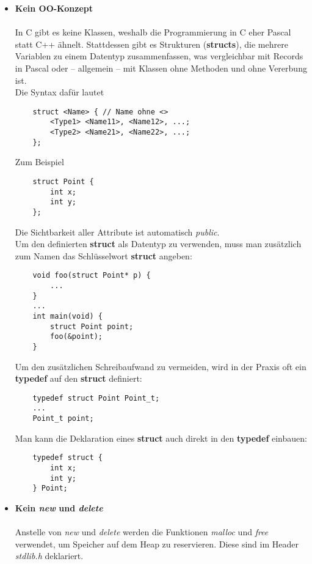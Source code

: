 \documentclass[
  accentcolor=tud1c,	%
  colorbacktitle,		%
  inverttitle,			%
  german,				%
  twoside
]{tudexercise}
\begin{document}
\begin{itemize}
\item[] \textbf{Kein OO-Konzept}\\\\
In C gibt es keine Klassen, weshalb die Programmierung in C eher Pascal statt C++ ähnelt.
Stattdessen gibt es Strukturen (\textbf{structs}), die mehrere Variablen zu einem Datentyp zusammenfassen, was vergleichbar mit Records in Pascal oder -- allgemein -- mit Klassen ohne Methoden und ohne Vererbung ist.\\

Die Syntax dafür lautet
\begin{lstlisting}
	struct <Name> { // Name ohne <>
		<Type1> <Name11>, <Name12>, ...;
		<Type2> <Name21>, <Name22>, ...;
	};
\end{lstlisting} 

Zum Beispiel
\begin{lstlisting}
	struct Point {
		int x;
		int y;
	};
\end{lstlisting}

Die Sichtbarkeit aller Attribute ist automatisch \emph{public}. \\

Um den definierten \textbf{struct} als Datentyp zu verwenden, muss man zusätzlich zum Namen das Schlüsselwort \textbf{struct} angeben:

\begin{lstlisting}
	void foo(struct Point* p) {
		...
	}
	...
	int main(void) {
		struct Point point;
		foo(&point);
	}
\end{lstlisting}

Um den zusätzlichen Schreibaufwand zu vermeiden, wird in der Praxis oft ein \textbf{typedef} auf den \textbf{struct} definiert:

\begin{lstlisting}
	typedef struct Point Point_t;
	...
	Point_t point;
\end{lstlisting}

Man kann die Deklaration eines \textbf{struct} auch direkt in den \textbf{typedef} einbauen:
\begin{lstlisting}
	typedef struct {
		int x;
		int y;	
	} Point;
\end{lstlisting}

\item[] \textbf{Kein \emph{new} und \emph{delete}}\\\\
Anstelle von \emph{new} und \emph{delete} werden die Funktionen \emph{malloc} und \emph{free} verwendet, um Speicher auf dem Heap zu reservieren. Diese sind im Header \emph{stdlib.h} deklariert.


\end{itemize}
\end{document}
